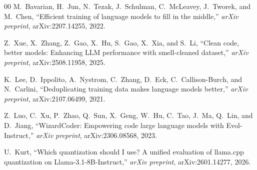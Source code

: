 \begin{thebibliography}{00}
M.~Bavarian, H.~Jun, N.~Tezak, J.~Schulman, C.~McLeavey,
J.~Tworek, and M.~Chen,
``Efficient training of language models to fill in the middle,''
\textit{arXiv preprint}, arXiv:2207.14255, 2022.

Z.~Xue, X.~Zhang, Z.~Gao, X.~Hu, S.~Gao, X.~Xia, and S.~Li,
``Clean code, better models: Enhancing LLM performance with
smell-cleaned dataset,''
\textit{arXiv preprint}, arXiv:2508.11958, 2025.

K.~Lee, D.~Ippolito, A.~Nystrom, C.~Zhang, D.~Eck,
C.~Callison-Burch, and N.~Carlini,
``Deduplicating training data makes language models better,''
\textit{arXiv preprint}, arXiv:2107.06499, 2021.

Z.~Luo, C.~Xu, P.~Zhao, Q.~Sun, X.~Geng, W.~Hu, C.~Tao,
J.~Ma, Q.~Lin, and D.~Jiang,
``WizardCoder: Empowering code large language models with
Evol-Instruct,''
\textit{arXiv preprint}, arXiv:2306.08568, 2023.

U.~Kurt,
``Which quantization should I use? A unified evaluation of
llama.cpp quantization on Llama-3.1-8B-Instruct,''
\textit{arXiv preprint}, arXiv:2601.14277, 2026.

\end{thebibliography}

